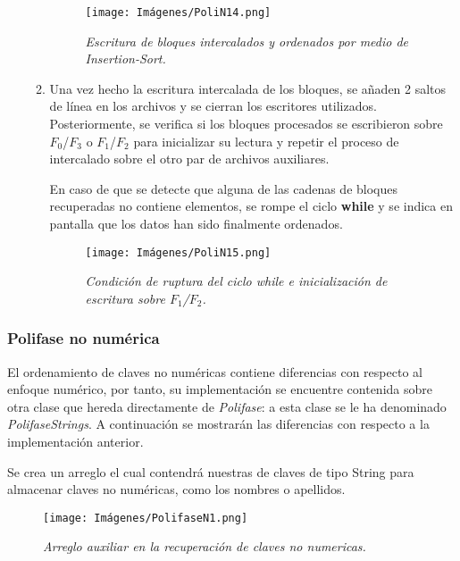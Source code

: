 \documentclass[letterpaper,12pt]{extarticle}
\begin{document}
\begin{itemize}
\begin{enumerate}
\begin{figure}[h!]
\centering
\texttt{[image: Imágenes/PoliN14.png]}
\caption{\textit{Escritura de bloques intercalados y ordenados por medio de Insertion-Sort.}}
\label{fig:PoliN14}
\end{figure}

\item Una vez hecho la escritura intercalada de los bloques, se añaden 2 saltos de línea en los archivos y se cierran los escritores utilizados. Posteriormente, se verifica si los bloques procesados se escribieron sobre $F_{0}$/$F_{3}$ o $F_{1}$/$F_{2}$ para inicializar su lectura y repetir el proceso de intercalado sobre el otro par de archivos auxiliares.

En caso de que se detecte que alguna de las cadenas de bloques recuperadas no contiene elementos, se rompe el ciclo \textbf{while} y se indica en pantalla que los datos han sido finalmente ordenados. 

\begin{figure}[h!]
\centering
\texttt{[image: Imágenes/PoliN15.png]}
\caption{\textit{Condición de ruptura del ciclo while e inicialización de escritura sobre $F_{1}$/$F_{2}$.}}
\label{fig:PoliN15}
\end{figure}


\end{enumerate}

\end{itemize}


\pagebreak


\subsubsection{Polifase no numérica}

\noindent El ordenamiento de claves no numéricas contiene diferencias con respecto al enfoque numérico, por tanto, su implementación se encuentre contenida sobre otra clase que hereda directamente de \textit{Polifase}: a esta clase se le ha denominado \textit{PolifaseStrings}. A continuación se mostrarán las diferencias con respecto a la implementación anterior. 

Se crea un arreglo el cual contendrá nuestras de claves de tipo String para almacenar claves no numéricas, como los nombres o apellidos.

\begin{figure}[h!]
\centering
\texttt{[image: Imágenes/PolifaseN1.png]}
\caption{\textit{Arreglo auxiliar en la recuperación de claves no numericas.}}
\label{fig:PolifaseN1}
\end{figure}
\end{document}
